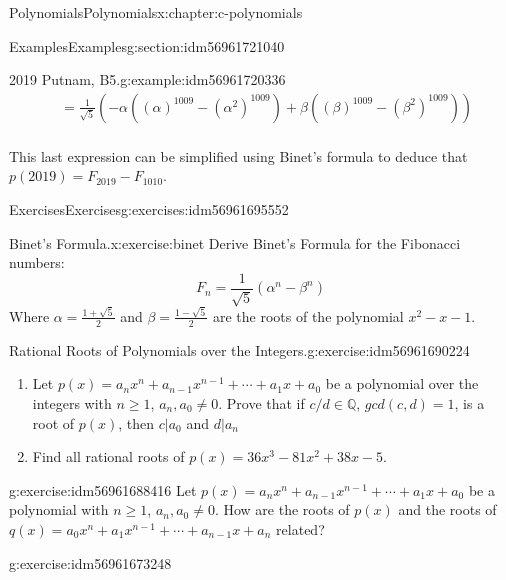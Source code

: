 \documentclass[twoside,10pt,]{book}
\numberwithin{equation}{section}
\begin{document}
\begin{chapterptx}{Polynomials}{}{Polynomials}{}{}{x:chapter:c-polynomials}
\begin{sectionptx}{Examples}{}{Examples}{}{}{g:section:idm56961721040}
\begin{example}{2019 Putnam, B5.}{g:example:idm56961720336}
\begin{equation*}
\begin{split}
&=\frac{1}{\sqrt{5}}\left(-\alpha((\alpha)^{1009} -(\alpha^2)^{1009} )
+\beta  ((\beta)^{1009} -(\beta^2)^{1009} )
\right)\\                       
\end{split}
\end{equation*}
%
\par
This last expression can be simplified using Binet's formula to deduce that \(p(2019) = F_{2019} - F_{1010}\).%
\end{example}
\end{sectionptx}
%
%
\typeout{************************************************}
\typeout{************************************************}
%
\begin{exercises-section}{Exercises}{}{Exercises}{}{}{g:exercises:idm56961695552}
\begin{divisionexercise}{1}{Binet's Formula.}{}{x:exercise:binet}%
%
Derive Binet's Formula for the Fibonacci numbers:%
\begin{equation*}
F_n=\frac{1}{\sqrt{5}}(\alpha^{n}-\beta^{n})
\end{equation*}
Where \(\alpha=\frac{1+\sqrt{5}}{2}\) and \(\beta=\frac{1-\sqrt{5}}{2}\) are the roots of the polynomial \(x^2-x-1\).%
\end{divisionexercise}%
\begin{divisionexercise}{2}{Rational Roots of Polynomials over the Integers.}{}{g:exercise:idm56961690224}%
%
\begin{enumerate}[label=(\alph*)]
\item{}Let \(p(x)= a_n x^n + a_{n-1}x^{n-1}+ \cdots +a_1 x + a_0\) be a polynomial over the integers with \(n\geq 1\), \(a_n, a_0 \neq 0\).  Prove that if \(c/d \in \mathbb{Q}\), \(gcd(c,d)=1\), is a root of \(p(x)\), then  \(c \vert a_0\) and \(d \vert a_n\)%
\item{}Find all rational roots of \(p(x)=36 x^3-81 x^2+38 x-5\).%
\end{enumerate}
%
\end{divisionexercise}%
\begin{divisionexercise}{3}{}{}{g:exercise:idm56961688416}%
Let \(p(x)= a_n x^n + a_{n-1}x^{n-1}+ \cdots +a_1 x + a_0\) be a polynomial with \(n\geq 1\), \(a_n, a_0 \neq 0\). How are the roots of \(p(x)\) and the roots of  \(q(x)= a_0 x^n + a_1 x^{n-1}+ \cdots +a_{n-1} x + a_n\) related?%
\end{divisionexercise}%
\begin{divisionexercise}{4}{}{}{g:exercise:idm56961673248}%

\end{divisionexercise}
\end{exercises-section}
\end{chapterptx}
\end{document}
